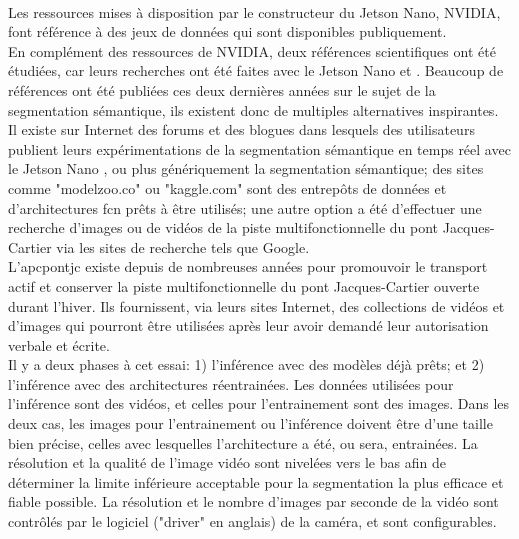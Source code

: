﻿\label{metho:data}
\vspace{0.5\baselineskip}
\\
Les ressources mises à disposition par le constructeur du Jetson Nano, NVIDIA, font référence à des jeux de données qui sont disponibles publiquement.
\vspace{0.5\baselineskip}
\\
\noindent En complément des ressources de NVIDIA, deux références scientifiques ont été étudiées, car leurs recherches ont été faites avec le Jetson Nano \parencite{nguyen_mavnet_2019} et \parencite{zheng_real-time_2020}. Beaucoup de références ont été publiées ces deux dernières années sur le sujet de la segmentation sémantique, ils existent donc de multiples alternatives inspirantes.
\vspace{0.5\baselineskip}
\\
\noindent Il existe sur Internet des forums et des blogues dans lesquels des utilisateurs publient leurs expérimentations de la segmentation sémantique en temps réel avec le Jetson Nano \parencite{dustin_realtime_2019}, ou plus génériquement la segmentation sémantique; des sites comme "modelzoo.co" ou "kaggle.com" sont des entrepôts de données et d'architectures \acrshort{fcn} prêts à être utilisés; une autre option a été d'effectuer une recherche d'images ou de vidéos de la piste multifonctionnelle du pont Jacques-Cartier via les sites de recherche tels que Google. 
\vspace{0.5\baselineskip}
\\
\noindent L'\acrlong{apcpontjc} existe depuis de nombreuses années pour promouvoir le transport actif et conserver la piste multifonctionnelle du pont Jacques-Cartier ouverte durant l'hiver. Ils fournissent, via leurs sites Internet, des collections de vidéos et d'images qui pourront être utilisées après leur avoir demandé leur autorisation verbale et écrite. \parencite{association_des_pietons_et_cyclistes_du_pont_jacques-cartier_pontjacques-cartier365com_2020, association_des_pietons_et_cyclistes_pont_jacques-cartier_flickr_2020}
\vspace{0.5\baselineskip}
\\
Il y a deux phases à cet essai: 1) l'inférence avec des modèles déjà prêts; et 2) l'inférence avec des architectures réentrainées. Les données utilisées pour l'inférence sont des vidéos, et celles pour l'entrainement sont des images. Dans les deux cas, les images pour l'entrainement ou l'inférence doivent être d'une taille bien précise, celles avec lesquelles l'architecture a été, ou sera, entrainées. La résolution et la qualité de l'image vidéo sont nivelées vers le bas afin de déterminer la limite inférieure acceptable pour la segmentation la plus efficace et fiable possible. La résolution et le nombre d'images par seconde de la vidéo sont contrôlés par le logiciel ("driver" en anglais) de la caméra, et sont configurables. 
